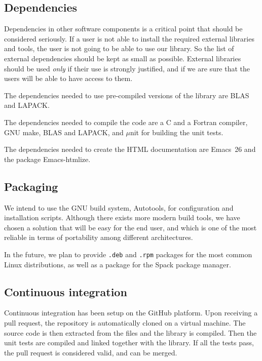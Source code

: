 \subsection{Dependencies}

Dependencies in other software components is a critical point that
should be considered seriously. If a user is not able to install the
required external libraries and tools, the user is not going to be
able to use our library. So the list of external dependencies should
be kept as small as possible.  External libraries should be used
\emph{only} if their use is strongly justified, and if we are sure
that the users will be able to have access to them.

The dependencies needed to use pre-compiled versions of the library
are \ac{BLAS} and \ac{LAPACK}.

The dependencies needed to compile the code are
a C and a Fortran compiler, GNU make, \ac{BLAS} and \ac{LAPACK}, and
$\mu$nit\cite{munit} for building the unit tests.

The dependencies needed to create the \ac{HTML} documentation are
Emacs~26 and the package Emacs-htmlize.

\subsection{Packaging}

We intend to use the GNU build system, Autotools,\cite{autotools} for
configuration and installation scripts.
Although there exists more modern build tools, we have chosen a
solution that will be easy for the end user, and which is one of the
most reliable in terms of portability among different architectures.

In the future, we plan to provide \texttt{.deb} and \texttt{.rpm}
packages for the most common Linux distributions, as well as a package
for the Spack package manager\cite{spack}.


\subsection{Continuous integration}

Continuous integration has been setup on the GitHub platform. Upon
receiving a pull request, the repository is automatically cloned on a virtual machine. The source code is then extracted from the {\orgmode}
files and the library is compiled. Then the unit tests are compiled
and linked together with the library. If all the tests pass, the
pull request is considered valid, and can be merged.

